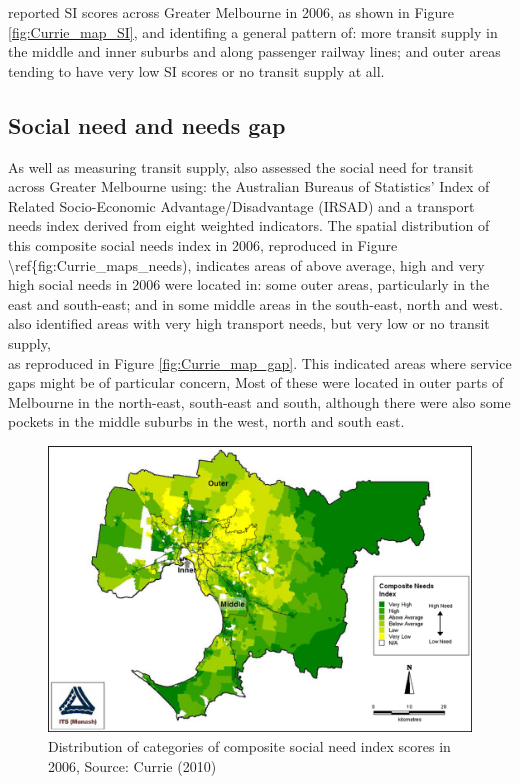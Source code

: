 \documentclass[preprint, 3p,
authoryear]{elsarticle} %
\begin{document}
\citet{currie2010identifying} reported SI scores across Greater
Melbourne in 2006, as shown in Figure \ref{fig:Currie_map_SI}, and
identifing a general pattern of: more transit supply in the middle and
inner suburbs and along passenger railway lines; and outer areas tending
to have very low SI scores or no transit supply at all.

\subsection{Social need and needs gap}\label{social-need-and-needs-gap}

As well as measuring transit supply, \citet{currie2010identifying} also
assessed the social need for transit across Greater Melbourne using: the
Australian Bureaus of Statistics' Index of Related Socio-Economic
Advantage/Disadvantage (IRSAD) and a transport needs index derived from
eight weighted indicators. The spatial distribution of this composite
social needs index in 2006, reproduced in Figure
\textbackslash ref\{fig:Currie\_maps\_needs), indicates areas of above
average, high and very high social needs in 2006 were located in: some
outer areas, particularly in the east and south-east; and in some middle
areas in the south-east, north and west. \citet{currie2010identifying}
also identified areas with very high transport needs, but very low or no
transit supply,\\
as reproduced in Figure \ref{fig:Currie_map_gap}. This indicated areas
where service gaps might be of particular concern, Most of these were
located in outer parts of Melbourne in the north-east, south-east and
south, although there were also some pockets in the middle suburbs in
the west, north and south east.

\begin{figure}
\includegraphics[width=1\linewidth]{graphics/Currie2010Needs} \caption{Distribution of categories of composite social need index scores in 2006, Source: Currie (2010)}\label{fig:Currie_map_needs}
\end{figure}
\end{document}
